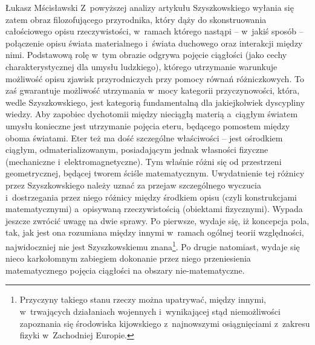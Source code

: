 \begin{artplenv}{Łukasz Mścisławski}
Z~powyższej analizy artykułu Szyszkowskiego wyłania się zatem obraz filozofującego przyrodnika, który dąży do skonstruowania całościowego opisu rzeczywistości, w~ramach którego nastąpi -- w~jakiś sposób -- połączenie opisu świata materialnego i~świata duchowego oraz interakcji między nimi. Podstawową rolę w~tym obrazie odgrywa pojęcie ciągłości (jako cechy charakterystycznej dla umysłu ludzkiego), którego utrzymanie warunkuje możliwość opisu zjawisk przyrodniczych przy pomocy równań różniczkowych. To zaś gwarantuje możliwość utrzymania w~mocy kategorii przyczynowości, która, wedle Szyszkowskiego, jest kategorią fundamentalną dla jakiejkolwiek dyscypliny wiedzy. Aby zapobiec dychotomii między nieciągłą materią a~ciągłym światem umysłu konieczne jest utrzymanie pojęcia eteru, będącego pomostem między oboma światami. Eter też ma dość szczególne właściwości -- jest ośrodkiem ciągłym, odmaterializowanym, posiadającym jednak własności fizyczne (mechaniczne i~elektromagnetyczne). Tym właśnie różni się od przestrzeni geometrycznej, będącej tworem ściśle matematycznym. Uwydatnienie tej różnicy przez Szyszkowskiego należy uznać za przejaw szczególnego wyczucia i~dostrzegania przez niego różnicy między środkiem opisu (czyli konstrukcjami matematycznymi) a~opisywaną rzeczywistością (obiektami fizycznymi). Wypada jeszcze zwrócić uwagę na dwie sprawy. Po pierwsze, wydaje się, iż koncepcja pola, tak, jak jest ona rozumiana między innymi w~ramach ogólnej teorii względności, najwidoczniej nie jest Szyszkowskiemu znana\footnote{Przyczyny takiego stanu rzeczy można upatrywać, między innymi, w~trwających działaniach wojennych i~wynikającej stąd niemożliwości zapoznania się środowiska kijowskiego z~najnowszymi osiągnięciami z~zakresu fizyki w~Zachodniej Europie.}. Po drugie natomiast, wydaje się nieco karkołomnym zabiegiem dokonanie przez niego przeniesienia matematycznego pojęcia ciągłości na obszary nie-matematyczne.


\end{artplenv}
